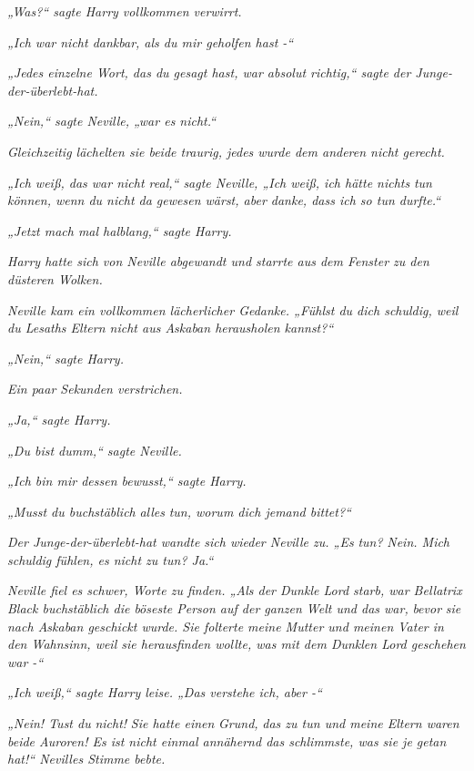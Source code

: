 {\emph{„Was?“ sagte Harry vollkommen verwirrt.}

\emph{„Ich war nicht dankbar, als du mir geholfen hast -“}

\emph{„Jedes einzelne Wort, das du gesagt hast, war absolut richtig,“ sagte der Junge-der-überlebt-hat.}

\emph{„Nein,“ sagte Neville, „war es nicht.“}

\emph{Gleichzeitig lächelten sie beide traurig, jedes wurde dem anderen nicht gerecht.}

\emph{„Ich weiß, das war nicht real,“ sagte Neville, „Ich weiß, ich hätte nichts} \emph{tun können, wenn du nicht da gewesen wärst, aber danke, dass ich so tun durfte.“}

\emph{„Jetzt mach mal halblang,“ sagte Harry.}

\emph{Harry hatte sich von Neville abgewandt und starrte aus dem Fenster zu den düsteren Wolken.}

\emph{Neville kam ein vollkommen lächerlicher Gedanke. „Fühlst du dich schuldig, weil du Lesaths Eltern nicht aus Askaban herausholen kannst?“}

\emph{„Nein,“ sagte Harry.}

\emph{Ein paar Sekunden verstrichen.}

\emph{„Ja,“ sagte Harry.}

\emph{„Du bist dumm,“ sagte Neville.}

\emph{„Ich bin mir dessen bewusst,“ sagte Harry.}

\emph{„Musst du buchstäblich} \emph{\emph{alles}} \emph{tun, worum dich jemand bittet?“}

\emph{Der Junge-der-überlebt-hat wandte sich wieder Neville zu. „Es} \emph{\emph{tun?}} \emph{Nein. Mich schuldig fühlen, es nicht zu tun? Ja.“}

\emph{Neville fiel es schwer, Worte zu finden. „Als der Dunkle Lord starb, war Bellatrix Black buchstäblich die böseste Person auf der ganzen Welt und das war,} \emph{\emph{bevor}} \emph{sie nach Askaban geschickt wurde. Sie folterte meine Mutter und meinen Vater in den Wahnsinn, weil sie herausfinden wollte, was mit dem Dunklen Lord geschehen war -“}

\emph{„Ich weiß,“ sagte Harry leise. „Das verstehe ich, aber -“}

\emph{„Nein! Tust du} \emph{\emph{nicht!}} \emph{Sie hatte einen} \emph{\emph{Grund}\emph{,}} \emph{das zu tun und meine Eltern waren beide Auroren! Es ist nicht einmal annähernd das schlimmste, was sie je getan hat!“ Nevilles Stimme bebte.}

}
